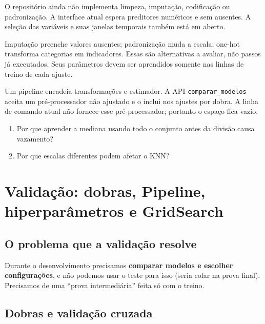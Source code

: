 \documentclass[11pt,a4paper]{article}
\newcommand{\cod}[1]{\texttt{#1}}
\begin{document}
O repositório ainda não implementa limpeza, imputação, codificação ou padronização. A interface atual espera preditores numéricos e sem ausentes. A seleção das variáveis e suas janelas temporais também está em aberto.

\begin{conceito}
Imputação preenche valores ausentes; padronização muda a escala; one-hot transforma categorias em indicadores. Essas são alternativas a avaliar, não passos já executados. Seus parâmetros devem ser aprendidos somente nas linhas de treino de cada ajuste.
\end{conceito}

\begin{conceito}[Pipeline]
Um pipeline encadeia transformações e estimador. A API \cod{comparar\_modelos} aceita um pré-processador não ajustado e o inclui nos ajustes por dobra. A linha de comando atual não fornece esse pré-processador; portanto o espaço fica vazio.
\end{conceito}

\begin{teste}
\begin{enumerate}
\item Por que aprender a mediana usando todo o conjunto antes da divisão causa vazamento?
\item Por que escalas diferentes podem afetar o KNN?
\end{enumerate}
\end{teste}


\newpage
\section{Validação: dobras, Pipeline, hiperparâmetros e GridSearch}

\subsection{O problema que a validação resolve}

Durante o desenvolvimento precisamos \textbf{comparar modelos e escolher configurações}, e não podemos usar o teste para isso
(seria colar na prova final). Precisamos de uma ``prova intermediária'' feita só com o treino.

\subsection{Dobras e validação cruzada}
\end{document}
